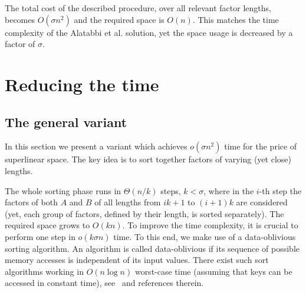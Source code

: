 \documentclass{llncs}
\begin{document}
The total cost of the described procedure, over all relevant factor lengths, 
becomes $O(\sigma n^2)$ and the required space is $O(n)$.
This matches the time complexity of the Alatabbi et al. solution, 
yet the space usage is decreased by a factor of $\sigma$.


\section{Reducing the time}

\subsection{The general variant}
\noindent 
In this section we present a variant which achieves $o(\sigma n^2)$ time 
for the price of superlinear space.
The key idea is to sort together factors of varying (yet close) lengths.

The whole sorting phase runs in $\Theta(n/k)$ steps, $k < \sigma$, 
where in the $i$-th step the factors of both $A$ and $B$ 
of all lengths from $ik+1$ to $(i+1)k$ 
are considered (yet, each group of factors, defined by their length, 
is sorted separately).
The required space grows to $O(kn)$.
To improve the time complexity, it is crucial to perform one step 
in $o(k\sigma n)$ time.
To this end, we make use of a data-oblivious sorting algorithm. 
An algorithm is called data-oblivious if its sequence of 
possible memory accesses is independent of its input values.
There exist such sort algorithms working in $O(n\log n)$ worst-case 
time (assuming that keys can be accessed in constant time), 
see~\cite{G2014} and references therein.
\end{document}
